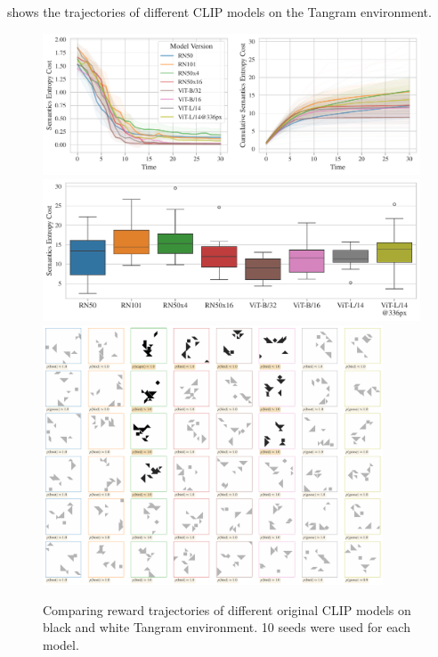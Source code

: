  shows the trajectories of different CLIP models on the Tangram environment.
\begin{figure}[h]
    \centering
    \includegraphics[width=\textwidth]{images/model_comparison.pdf}
    \includegraphics[width=\textwidth]{images/model_comparison_boxplot.pdf}
    \includegraphics[width=0.9\textwidth]{images/model_samples.pdf}
    \caption{Comparing reward trajectories of different original CLIP models on black and white Tangram environment. 10 seeds were used for each model.}
    \label{fig:clip-traj-comparison}
\end{figure}

